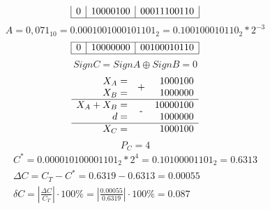 \documentclass{article}
\begin{document}
\begin{enumerate}
$$\begin{array}{|c|c|c|}
                            0 & 10000100 & 00011100110 \\\hline
                     \end{array}
              $$
              $$ A = 0,071_{10} = 0.0001001000101101_{2} = 0.100100010110_{2} * 2^{-3} $$
              $$
                     \begin{array}{|c|c|c|}
                            \hline        
                            0 & 10000000 & 00100010110 \\\hline
                     \end{array}
              $$
              $$ SignC = SignA \oplus SignB = 0 $$
              $$
                    \begin{array}{rcr}
                           X_A         = & \PLUS  & 1000100         \\
                           X_B         = &        & 1000000 \nl
                           X_A + X_B   = & \MINUS & 10000100        \\
                           d           = &        & 1000000     \nl
                           X_C         = &        & 1000100
                    \end{array}
             $$
             $$ P_C = 4 $$
              $$
                     \begin{array}{c}
                            C^* = 0.000010100001101_{2} * 2^4 = 0.10100001101_{2} = 0.6313\\
                            \Delta C = C_T - C^* = 0.6319 - 0.6313 = 0.00055 \\
                            \delta C = \left|\frac{\Delta C}{C_T}\right| \cdot 100\% = \left|\frac{0.00055}{0.6319}\right| \cdot 100\% = 0.087 \\
                     \end{array}
              $$
\end{enumerate}
\end{document}
